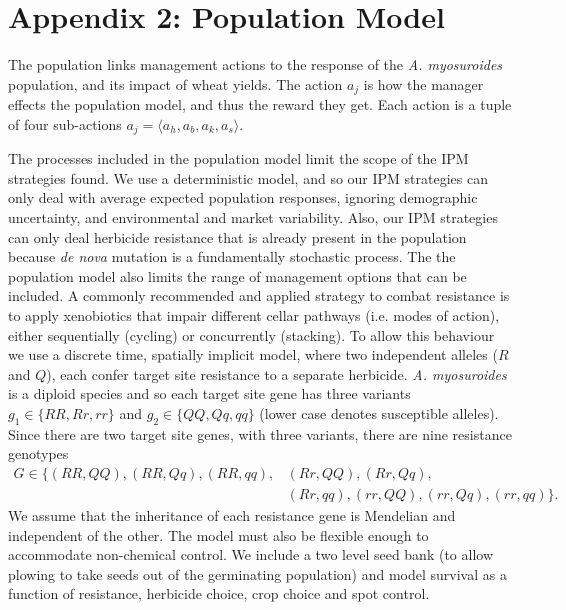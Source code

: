 \documentclass[12pt, a4paper]{article}
\begin{document}
\section*{Appendix 2: Population Model}
The population links management actions to the response of the \textit{A. myosuroides} population, and its impact of wheat yields. The action $a_j$ is how the manager effects the population model, and thus the reward they get. Each action is a tuple of four sub-actions $a_j = \langle a_h, a_b, a_k, a_s \rangle$. 

The processes included in the population model limit the scope of the IPM strategies found. We use a deterministic model, and so our IPM strategies can only deal with average expected population responses, ignoring demographic uncertainty, and environmental and market variability. Also, our IPM strategies can only deal herbicide resistance that is already present in the population because \textit{de nova} mutation is a fundamentally stochastic process. The the population model also limits the range of management options that can be included. A commonly recommended \citep{REX2013} and applied \citep{Hick2018} strategy to combat resistance is to apply xenobiotics that impair different cellar pathways (i.e. modes of action), either sequentially (cycling) or concurrently (stacking). To allow this behaviour we use a discrete time, spatially implicit model, where two independent alleles ($R$ and $Q$), each confer target site resistance to a separate herbicide. \textit{A. myosuroides} is a diploid species and so each target site gene has three variants $g_1 \in \{RR, Rr, rr\}$ and $g_2 \in \{QQ, Qq, qq\}$ (lower case denotes susceptible alleles). Since there are two target site genes, with three variants, there are nine resistance genotypes 
\begin{align*}
	G \in \{(RR, QQ), (RR, Qq), (RR, qq), &(Rr, QQ), (Rr, Qq),\\
		&(Rr, qq), (rr, QQ), (rr, Qq), (rr, qq)\}.  
\end{align*}
We assume that the inheritance of each resistance gene is Mendelian and independent of the other. The model must also be flexible enough to accommodate non-chemical control. We include a two level seed bank (to allow plowing to take seeds out of the germinating population) and model survival as a function of resistance, herbicide choice, crop choice and spot control.
\end{document}
